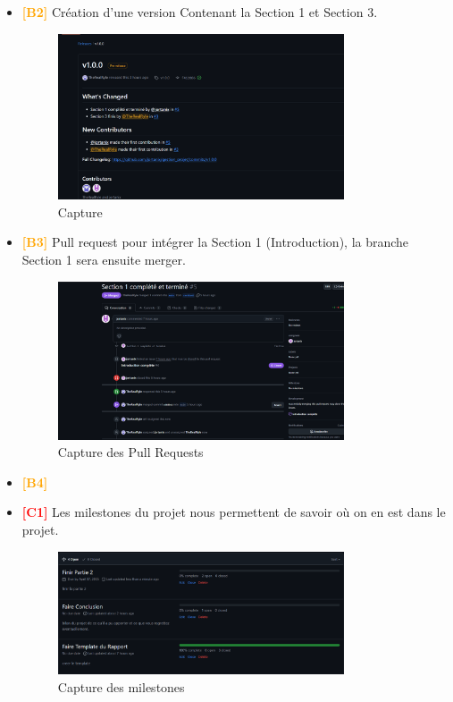 \begin{itemize}
    \item \textbf{\textcolor{orange}{[B2]}} Création d'une version Contenant la Section 1 et Section 3.
    \begin{figure}[H]
    \centering
    \includegraphics[width=0.8\textwidth]{Images/B2.png}
    \caption{Capture}
    \label{fig:imageB2}
    \end{figure}
    
    \item \textbf{\textcolor{orange}{[B3]}} Pull request pour intégrer la Section 1 (Introduction), la branche Section 1 sera ensuite merger.
    \begin{figure}[H]
    \centering
    \includegraphics[width=0.8\textwidth]{Images/B3.png}
    \caption{Capture des Pull Requests}
    \label{fig:imageB3}
    \end{figure}

    
    \item \textbf{\textcolor{orange}{[B4]}}
    \item \textbf{\textcolor{red}{[C1]}} Les milestones du projet nous permettent de savoir où on en est dans le projet.
    \begin{figure}[H]
    \centering
    \includegraphics[width=0.8\textwidth]{Images/C1.png}
    \caption{Capture des milestones}
    \label{fig:imageC1}
    \end{figure}

\end{itemize}